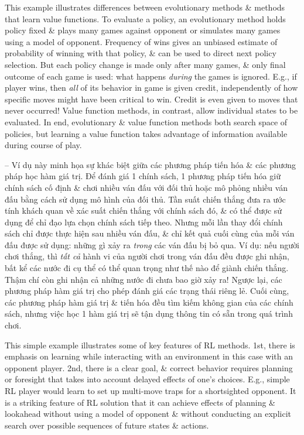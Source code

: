 \documentclass{article}
\begin{document}
\begin{itemize}
\begin{itemize}
        This example illustrates differences between evolutionary methods \& methods that learn value functions. To evaluate a policy, an evolutionary method holds policy fixed \& plays many games against opponent or simulates many games using a model of opponent. Frequency of wins gives an unbiased estimate of probability of winning with that policy, \& can be used to direct next policy selection. But each policy change is made only after many games, \& only final outcome of each game is used: what happens {\it during} the games is ignored. E.g., if player wins, then {\it all} of its behavior in game is given credit, independently of how specific moves might have been critical to win. Credit is even given to moves that never occurred! Value function methods, in contrast, allow individual states to be evaluated. In end, evolutionary \& value function methods both search space of policies, but learning a value function takes advantage of information available during course of play.

        -- Ví dụ này minh họa sự khác biệt giữa các phương pháp tiến hóa \& các phương pháp học hàm giá trị. Để đánh giá 1 chính sách, 1 phương pháp tiến hóa giữ chính sách cố định \& chơi nhiều ván đấu với đối thủ hoặc mô phỏng nhiều ván đấu bằng cách sử dụng mô hình của đối thủ. Tần suất chiến thắng đưa ra ước tính khách quan về xác suất chiến thắng với chính sách đó, \& có thể được sử dụng để chỉ đạo lựa chọn chính sách tiếp theo. Nhưng mỗi lần thay đổi chính sách chỉ được thực hiện sau nhiều ván đấu, \& chỉ kết quả cuối cùng của mỗi ván đấu được sử dụng: những gì xảy ra {\it trong} các ván đấu bị bỏ qua. Ví dụ: nếu người chơi thắng, thì {\it tất cả} hành vi của người chơi trong ván đấu đều được ghi nhận, bất kể các nước đi cụ thể có thể quan trọng như thế nào để giành chiến thắng. Thậm chí còn ghi nhận cả những nước đi chưa bao giờ xảy ra! Ngược lại, các phương pháp hàm giá trị cho phép đánh giá các trạng thái riêng lẻ. Cuối cùng, các phương pháp hàm giá trị \& tiến hóa đều tìm kiếm không gian của các chính sách, nhưng việc học 1 hàm giá trị sẽ tận dụng thông tin có sẵn trong quá trình chơi.

        This simple example illustrates some of key features of RL methods. 1st, there is emphasis on learning while interacting with an environment in this case with an opponent player. 2nd, there is a clear goal, \& correct behavior requires planning or foresight that takes into account delayed effects of one's choices. E.g., simple RL player would learn to set up multi-move traps for a shortsighted opponent. It is a striking feature of RL solution that it can achieve effects of planning \& lookahead without using a model of opponent \& without conducting an explicit search over possible sequences of future states \& actions.


\end{itemize}
\end{itemize}
\end{document}
